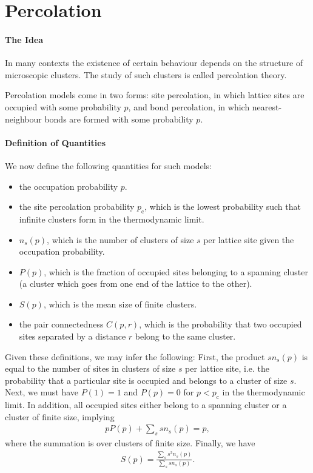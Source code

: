 \section{Percolation}

\paragraph{The Idea}
In many contexts the existence of certain behaviour depends on the structure of microscopic clusters. The study of such clusters is called percolation theory.

Percolation models come in two forms: site percolation, in which lattice sites are occupied with some probability $p$, and bond percolation, in which nearest-neighbour bonds are formed with some probability $p$.

\paragraph{Definition of Quantities}
We now define the following quantities for such models:

\begin{itemize}
	\item the occupation probability $p$.
	\item the site percolation probability $p_{\text{c}}$, which is the lowest probability such that infinite clusters form in the thermodynamic limit.
	\item $n_{s}(p)$, which is the number of clusters of size $s$ per lattice site given the occupation probability.
	\item $P(p)$, which is the fraction of occupied sites belonging to a spanning cluster (a cluster which goes from one end of the lattice to the other).
	\item $S(p)$, which is the mean size of finite clusters.
	\item the pair connectedness $C(p, r)$, which is the probability that two occupied sites separated by a distance $r$ belong to the same cluster.
\end{itemize}

Given these definitions, we may infer the following: First, the product $sn_{s}(p)$ is equal to the number of sites in clusters of size $s$ per lattice site, i.e. the probability that a particular site is occupied and belongs to a cluster of size $s$. Next, we must have $P(1) = 1$ and $P(p) = 0$ for $p < p_{\text{c}}$ in the thermodynamic limit. In addition, all occupied sites either belong to a spanning cluster or a cluster of finite size, implying
\begin{align*}
	pP(p) + \sum\limits_{s}sn_{s}(p) = p,
\end{align*}
where the summation is over clusters of finite size. Finally, we have
\begin{align*}
	S(p) = \frac{\sum\limits_{s}s^{2}n_{s}(p)}{\sum\limits_{s}sn_{s}(p)}.
\end{align*}

